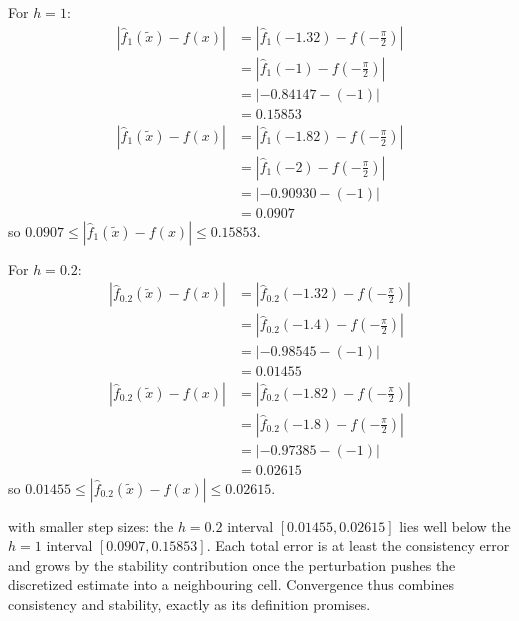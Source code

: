 For $h=1$:
\begin{align*}
    \left| \hat{f}_1(\tilde{x}) - f(x) \right| &= \left| \hat{f}_1(-1.32) - f(-\frac{\pi}{2}) \right| \\
    &= \left| \hat{f}_1(-1) - f(-\frac{\pi}{2}) \right| \\
    &= \left| -0.84147 - (-1) \right| \\
    &= 0.15853 \\[1em]
    \left| \hat{f}_1(\tilde{x}) - f(x) \right| &= \left| \hat{f}_1(-1.82) - f(-\frac{\pi}{2}) \right| \\
    &= \left| \hat{f}_1(-2) - f(-\frac{\pi}{2}) \right| \\
    &= \left| -0.90930 - (-1) \right| \\
    &= 0.0907
\end{align*}
so $0.0907 \leq \left| \hat{f}_1(\tilde{x}) - f(x) \right| \leq 0.15853$.

\vspace{1em}
For $h=0.2$:
\begin{align*}
    \left| \hat{f}_{0.2}(\tilde{x}) - f(x) \right| &= \left| \hat{f}_{0.2}(-1.32) - f(-\frac{\pi}{2}) \right| \\
    &= \left| \hat{f}_{0.2}(-1.4) - f(-\frac{\pi}{2}) \right| \\
    &= \left| -0.98545 - (-1) \right| \\
    &= 0.01455 \\[1em]
    \left| \hat{f}_{0.2}(\tilde{x}) - f(x) \right| &= \left| \hat{f}_{0.2}(-1.82) - f(-\frac{\pi}{2}) \right| \\
    &= \left| \hat{f}_{0.2}(-1.8) - f(-\frac{\pi}{2}) \right| \\
    &= \left| -0.97385 - (-1) \right| \\
    &= 0.02615
\end{align*}
so $0.01455 \leq \left| \hat{f}_{0.2}(\tilde{x}) - f(x) \right| \leq 0.02615$.

 with smaller step sizes: the $h=0.2$ interval $[0.01455, 0.02615]$ lies well below the $h=1$ interval $[0.0907, 0.15853]$.
Each total error is at least the consistency error and grows by the stability contribution once the perturbation pushes the discretized estimate into a neighbouring cell.
Convergence thus combines consistency and stability, exactly as its definition promises.




